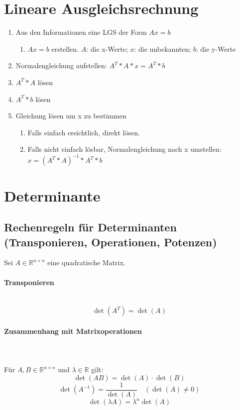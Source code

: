 \documentclass[10pt,a4paper,twocolumn]{article}
\newcommand{\seccol}{black}
\newcommand{\setseccol}[1]{\renewcommand{\seccol}{#1}}
\begin{document}
	\section{Lineare Ausgleichsrechnung}
	\begin{enumerate}
		\item Aus den Informationen eine LGS der Form $Ax=b$
		\begin{enumerate}
			\item $Ax=b$ erstellen. $A$: die x-Werte; $x$: die unbekannten; $b$: die y-Werte
		\end{enumerate}
		\item Normalengleichung aufstellen: $A^T*A*x=A^T*b$
		\item $A^T*A$ lösen
		\item $A^T*b$ lösen
		\item Gleichung lösen um x zu bestimmen
		\begin{enumerate}
			\item Falls einfach ersichtlich, direkt lösen.
			\item Falls nicht einfach lösbar, Normalengleichung nach x umstellen: $x=(A^T*A)^{-1}*A^T*b$
		\end{enumerate}
	\end{enumerate}
	
	\setseccol{c5}
	\section{Determinante}
	\subsection{Rechenregeln für Determinanten (Transponieren, Operationen, Potenzen)}
	
	Sei $A\in\mathbb{R}^{n\times n}$ eine quadratische Matrix.
	
	\paragraph{Transponieren}\mbox{}\\
	\[
	\det(A^T)=\det(A)
	\]
	
	\paragraph{Zusammenhang mit Matrixoperationen}\mbox{}\\
	\\
	Für $A,B\in\mathbb{R}^{n\times n}$ und $\lambda\in\mathbb{R}$ gilt:
	\[
	\det(AB)=\det(A)\cdot\det(B)
	\]
	\[
	\det(A^{-1})=\frac{1}{\det(A)} \quad (\det(A)\neq 0)
	\]
	\[
	\det(\lambda A)=\lambda^{n}\det(A)
	\]
	
\end{document}
